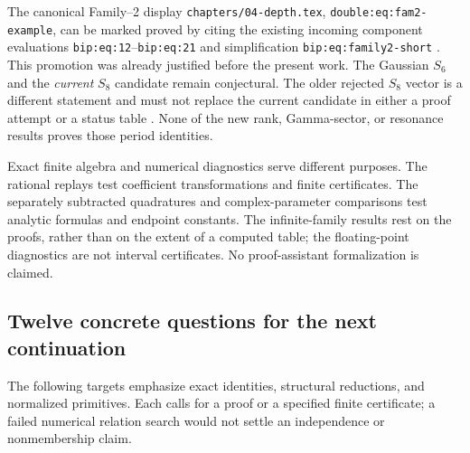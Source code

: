 The canonical Family--2 display
\texttt{chapters/04-depth.tex}, \texttt{double:eq:fam2-example},
can be marked proved by citing the existing incoming component
evaluations \texttt{bip:eq:12}--\texttt{bip:eq:21} and simplification
\texttt{bip:eq:family2-short} \cite{PTI}. This promotion was already
justified before the present work. The Gaussian $S_6$ and the
\emph{current} $S_8$ candidate remain conjectural. The older rejected
$S_8$ vector is a different statement and must not replace the current
candidate in either a proof attempt or a status table \cite{Repo,PTI}.
None of the new rank, Gamma-sector, or resonance results proves those
period identities.

Exact finite algebra and numerical diagnostics serve different
purposes. The rational replays test coefficient transformations and
finite certificates. The separately subtracted quadratures and
complex-parameter comparisons test analytic formulas and endpoint
constants. The infinite-family results rest on the proofs, rather than
on the extent of a computed table; the floating-point diagnostics are
not interval certificates. No proof-assistant formalization is claimed.

\subsection{Twelve concrete questions for the next continuation}
\label{audit:future}

The following targets emphasize exact identities, structural reductions,
and normalized primitives. Each calls for a proof or a specified finite
certificate; a failed numerical relation search would not settle an
independence or nonmembership claim.

